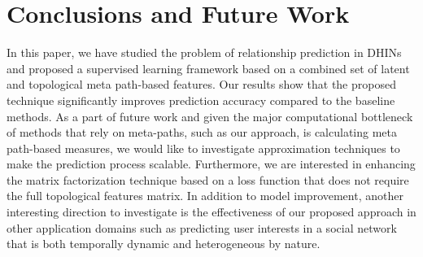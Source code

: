 \section{Conclusions and Future Work}

In this paper, we have studied the problem of relationship prediction in DHINs and proposed a supervised learning framework based on a combined set of latent and topological meta path-based features. Our results show that the proposed technique significantly improves prediction accuracy compared to the baseline methods. As a part of future work and given the major computational bottleneck of methods that rely on meta-paths, such as our approach, is calculating meta path-based measures, we would like to investigate approximation techniques to make  the prediction process scalable. Furthermore, we are interested in enhancing the matrix factorization technique based on a loss function that does not require the full topological features matrix. In addition to model improvement, another interesting direction to investigate is the effectiveness of our proposed approach in other application domains such as predicting user interests in a social network that is both temporally dynamic and heterogeneous by nature. 




